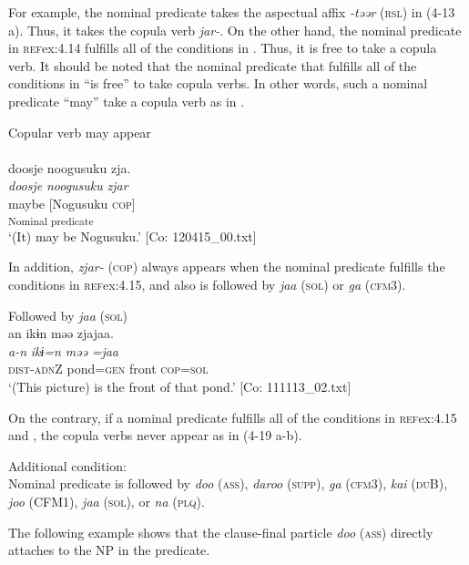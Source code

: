 For example, the nominal predicate takes the aspectual affix \textit{{}-təər} (\textsc{rsl}) in (4-13 a). Thus, it takes the copula verb \textit{jar-}. On the other hand, the nominal predicate in \textsc{ref}{ex:4.14} fulfills all of the conditions in . Thus, it is free to take a copula verb. It should be noted that the nominal predicate that fulfills all of the conditions in  “is free” to take copula verbs. In other words, such a nominal predicate “may” take a copula verb as in .

\ea  Copular verb may appear \label{ex:4.16}\\\\
\gllll    doosje  noogusuku  zja.\\
    \textit{doosje}  \textit{noogusuku}  \textit{zjar}\\
    maybe  [Nogusuku  \textsc{cop}]\\
      [NP  Copular verb]\textsubscript{Nominal predicate}\\
    \glt     ‘(It) may be Nogusuku.’ [Co: 120415\_00.txt]
\z

  In addition, \textit{zjar-} (\textsc{cop}) always appears when the nominal predicate fulfills the conditions in \textsc{ref}{ex:4.15}, and also is followed by \textit{jaa} (\textsc{sol}) or \textit{ga} (\textsc{cfm}3).

\ea  Followed by \textit{jaa} (\textsc{sol}) \label{ex:4.17}\\
\glll  an  ikɨn  məə  zjajaa.\\
    \textit{a-n}  \textit{ikɨ=n}  \textit{məə}  \textit{=jaa}\\
    \textsc{dist}-\textsc{adn}Z  pond=\textsc{gen}  front  \textsc{cop}=\textsc{sol}\\
    \glt     ‘(This picture) is the front of that pond.’ [Co: 111113\_02.txt]
\z

  On the contrary, if a nominal predicate fulfills all of the conditions in \textsc{ref}{ex:4.15} and , the copula verbs never appear as in (4-19 a-b).

\ea  Additional condition: \label{ex:4.18}\\
  Nominal predicate is followed by \textit{doo} (\textsc{ass}), \textit{daroo} (\textsc{supp}), \textit{ga} (\textsc{cfm}3), \textit{kai} (\textsc{du}B), \textit{joo} (CFM1), \textit{jaa} (\textsc{sol}), or \textit{na} (\textsc{plq}).
\z

The following example shows that the clause-final particle \textit{doo} (\textsc{ass}) directly attaches to the NP in the predicate.

